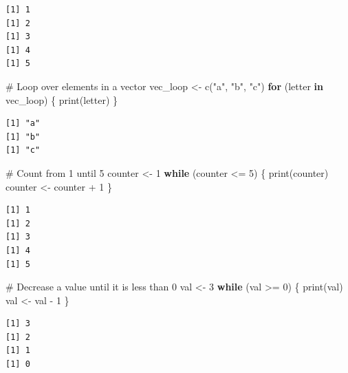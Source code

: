 \documentclass[
  letterpaper,
  DIV=11,
  numbers=noendperiod]{scrartcl}
\newenvironment{Shaded}{\begin{snugshade}}{\end{snugshade}}
\newcommand{\CommentTok}[1]{\textcolor[rgb]{0.37,0.37,0.37}{#1}}
\newcommand{\ControlFlowTok}[1]{\textcolor[rgb]{0.00,0.23,0.31}{\textbf{#1}}}
\newcommand{\DecValTok}[1]{\textcolor[rgb]{0.68,0.00,0.00}{#1}}
\newcommand{\FunctionTok}[1]{\textcolor[rgb]{0.28,0.35,0.67}{#1}}
\newcommand{\NormalTok}[1]{\textcolor[rgb]{0.00,0.23,0.31}{#1}}
\newcommand{\OtherTok}[1]{\textcolor[rgb]{0.00,0.23,0.31}{#1}}
\newcommand{\SpecialCharTok}[1]{\textcolor[rgb]{0.37,0.37,0.37}{#1}}
\newcommand{\StringTok}[1]{\textcolor[rgb]{0.13,0.47,0.30}{#1}}
\begin{document}
\begin{verbatim}
[1] 1
[1] 2
[1] 3
[1] 4
[1] 5
\end{verbatim}

\begin{Shaded}
\begin{Highlighting}[]
\CommentTok{\#   Loop over elements in a vector}
\NormalTok{vec\_loop }\OtherTok{\textless{}{-}} \FunctionTok{c}\NormalTok{(}\StringTok{"a"}\NormalTok{, }\StringTok{"b"}\NormalTok{, }\StringTok{"c"}\NormalTok{)}
\ControlFlowTok{for}\NormalTok{ (letter }\ControlFlowTok{in}\NormalTok{ vec\_loop) \{}
  \FunctionTok{print}\NormalTok{(letter)}
\NormalTok{\}}
\end{Highlighting}
\end{Shaded}

\begin{verbatim}
[1] "a"
[1] "b"
[1] "c"
\end{verbatim}

\begin{Shaded}
\begin{Highlighting}[]
\CommentTok{\#   Count from 1 until 5}
\NormalTok{counter }\OtherTok{\textless{}{-}} \DecValTok{1}
\ControlFlowTok{while}\NormalTok{ (counter }\SpecialCharTok{\textless{}=} \DecValTok{5}\NormalTok{) \{}
  \FunctionTok{print}\NormalTok{(counter)}
\NormalTok{  counter }\OtherTok{\textless{}{-}}\NormalTok{ counter }\SpecialCharTok{+} \DecValTok{1}
\NormalTok{\}}
\end{Highlighting}
\end{Shaded}

\begin{verbatim}
[1] 1
[1] 2
[1] 3
[1] 4
[1] 5
\end{verbatim}

\begin{Shaded}
\begin{Highlighting}[]
\CommentTok{\#   Decrease a value until it is less than 0}
\NormalTok{val }\OtherTok{\textless{}{-}} \DecValTok{3}
\ControlFlowTok{while}\NormalTok{ (val }\SpecialCharTok{\textgreater{}=} \DecValTok{0}\NormalTok{) \{}
  \FunctionTok{print}\NormalTok{(val)}
\NormalTok{  val }\OtherTok{\textless{}{-}}\NormalTok{ val }\SpecialCharTok{{-}} \DecValTok{1}
\NormalTok{\}}
\end{Highlighting}
\end{Shaded}

\begin{verbatim}
[1] 3
[1] 2
[1] 1
[1] 0
\end{verbatim}
\end{document}
